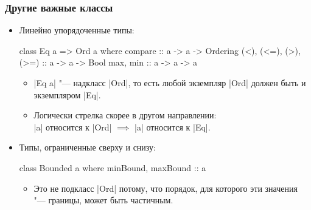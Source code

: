 \documentclass[10pt]{beamer}
\begin{document}
\begin{frame}[fragile]
  \frametitle{Другие важные классы}
  \begin{itemize}
    \item
          Линейно упорядоченные типы:
          \begin{haskell}
            class Eq a => Ord a where
                compare :: a -> a -> Ordering
                (<), (<=), (>), (>=) :: a -> a -> Bool 
                max, min :: a -> a -> a
          \end{haskell}
          \begin{itemize}
            \item \haskinline|Eq a| "--- надкласс \haskinline|Ord|, то есть любой экземпляр \haskinline|Ord| должен быть и экземпляром \haskinline|Eq|. \pause
            \item Логически стрелка скорее в другом направлении:\\ \haskinline|a| относится к \haskinline|Ord| $\implies$ \haskinline|a| относится к \haskinline|Eq|.
          \end{itemize}
          \pause
    \item
          Типы, ограниченные сверху и снизу:
          \begin{haskell}
            class Bounded a where
                minBound, maxBound :: a 
          \end{haskell}
          \begin{itemize}
            \item Это не подкласс \haskinline|Ord| потому, что порядок, для которого эти значения "--- границы, может быть частичным.
          \end{itemize}
  \end{itemize}
\end{frame}
\end{document}
